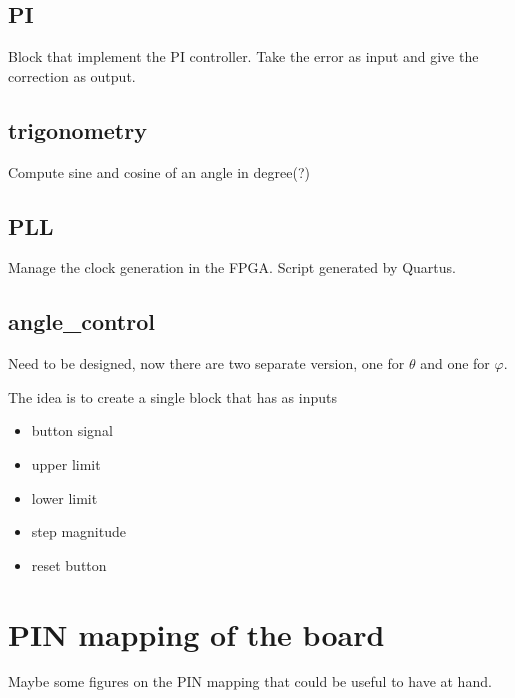 \documentclass[a4paper,10pt,twoside]{article}
\newcommand{\0}{\textbf{0}}
\newcommand{\1}{\textbf{1}}
\begin{document}
    \subsection{PI}
        Block that implement the PI controller. 
        Take the error as input and give the correction as output.

    \subsection{trigonometry}
        Compute sine and cosine of an angle in degree(?)


    \subsection{PLL}
        Manage the clock generation in the FPGA. Script generated by Quartus.

    \subsection{angle\_control}
        Need to be designed, now there are two separate version, one for $\theta$ and one for $\varphi$.

        The idea is to create a single block that has as inputs
        \begin{itemize}
            \item button signal
            \item upper limit
            \item lower limit
            \item step magnitude
            \item reset button
        \end{itemize}




\section{PIN mapping of the board}
    Maybe some figures on the PIN mapping that could be useful to have at hand.
\end{document}
